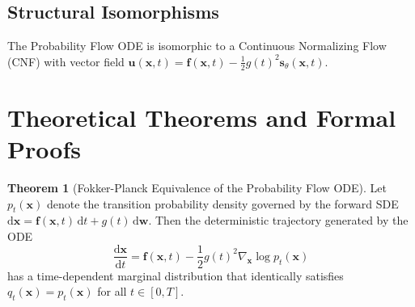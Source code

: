 \documentclass[11pt,a4paper]{article}
\theoremstyle{definition}
\newtheorem{theorem}{\textbf{Theorem}}[section]
\begin{document}
\subsection{Structural Isomorphisms}
The Probability Flow ODE is isomorphic to a Continuous Normalizing Flow (CNF) with vector field $\mathbf{u}(\mathbf{x}, t) = \mathbf{f}(\mathbf{x}, t) - \frac{1}{2}g(t)^2 \mathbf{s}_\theta(\mathbf{x}, t)$.

\section{Theoretical Theorems and Formal Proofs}

\begin{theorem}[Fokker-Planck Equivalence of the Probability Flow ODE]
Let $p_t(\mathbf{x})$ denote the transition probability density governed by the forward SDE $\mathrm{d}\mathbf{x} = \mathbf{f}(\mathbf{x}, t)\,\mathrm{d}t + g(t)\,\mathrm{d}\mathbf{w}$. Then the deterministic trajectory generated by the ODE
{\boldmath
\begin{equation}
\frac{\mathrm{d}\mathbf{x}}{\mathrm{d}t} = \mathbf{f}(\mathbf{x}, t) - \frac{1}{2}g(t)^2 \nabla_\mathbf{x} \log p_t(\mathbf{x})
\end{equation}
}
has a time-dependent marginal distribution that identically satisfies $q_t(\mathbf{x}) = p_t(\mathbf{x})$ for all $t \in [0, T]$.
\end{theorem}
\end{document}
